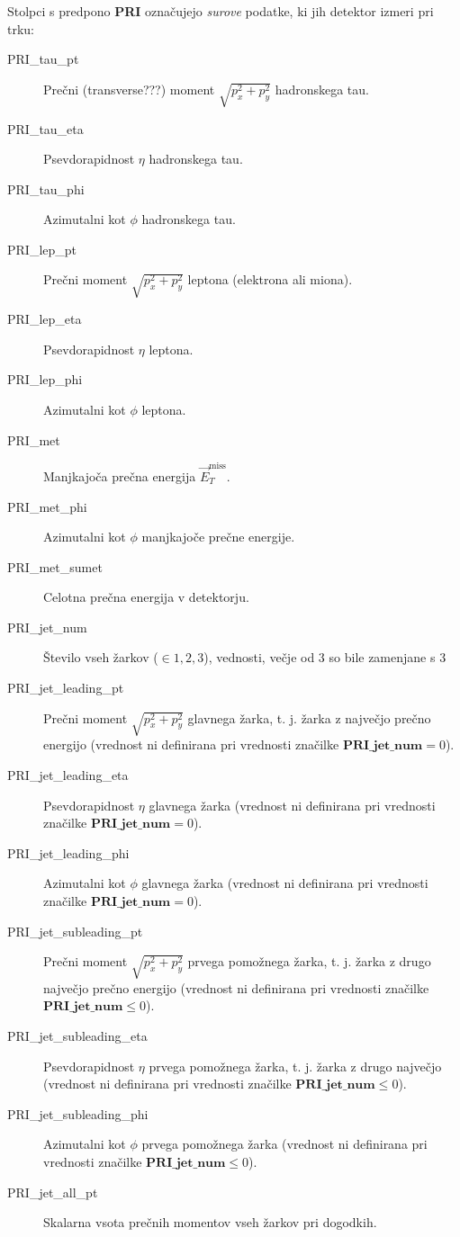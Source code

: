 \documentclass[11pt,a4paper,openany]{book}
\begin{document}
Stolpci s predpono \textbf{PRI} označujejo \textit{surove} podatke, ki jih detektor izmeri pri trku:
\begin{changemargin}{0.5cm}{0.0cm} 
\begin{description}
	\item[PRI\_tau\_pt] Prečni (transverse???) moment $\sqrt{p_x^2 + p_y^2}$ hadronskega tau.
	\item[PRI\_tau\_eta] Psevdorapidnost $\eta$ hadronskega tau.
	\item[PRI\_tau\_phi] Azimutalni kot $\phi$ hadronskega tau.
	
	\item[PRI\_lep\_pt] Prečni moment $\sqrt{p_x^2 + p_y^2}$ leptona (elektrona ali miona).
	\item[PRI\_lep\_eta] Psevdorapidnost $\eta$ leptona.
	\item[PRI\_lep\_phi] Azimutalni kot $\phi$ leptona.
	
	\item[PRI\_met] Manjkajoča prečna energija $\vec{E}_T^{\text{miss}}$.
	\item[PRI\_met\_phi] Azimutalni kot $\phi$ manjkajoče prečne energije.
	
	\item[PRI\_met\_sumet] Celotna prečna energija v detektorju.
	
	\item[PRI\_jet\_num] Število vseh žarkov ($\in {1, 2, 3}$), vednosti, večje od $3$ so bile zamenjane s 3
	
	\item[PRI\_jet\_leading\_pt] Prečni moment $\sqrt{p_x^2 + p_y^2}$ glavnega žarka, t. j. žarka z največjo prečno energijo (vrednost ni definirana pri vrednosti značilke $\textbf{PRI\_jet\_num} = 0$).
	\item[PRI\_jet\_leading\_eta] Psevdorapidnost $\eta$ glavnega žarka (vrednost ni definirana pri vrednosti značilke $\textbf{PRI\_jet\_num} = 0$).
	\item[PRI\_jet\_leading\_phi] Azimutalni kot $\phi$ glavnega žarka (vrednost ni definirana pri vrednosti značilke $\textbf{PRI\_jet\_num} = 0$).
	
	\item[PRI\_jet\_subleading\_pt] Prečni moment $\sqrt{p_x^2 + p_y^2}$ prvega pomožnega žarka, t. j. žarka z drugo največjo prečno energijo (vrednost ni definirana pri vrednosti značilke $\textbf{PRI\_jet\_num} \le 0$).
	\item[PRI\_jet\_subleading\_eta] Psevdorapidnost $\eta$ prvega pomožnega žarka, t. j. žarka z drugo največjo (vrednost ni definirana pri vrednosti značilke $\textbf{PRI\_jet\_num} \le 0$).
	\item[PRI\_jet\_subleading\_phi] Azimutalni kot $\phi$ prvega pomožnega žarka (vrednost ni definirana pri vrednosti značilke $\textbf{PRI\_jet\_num} \le 0$).
	
	\item[PRI\_jet\_all\_pt] Skalarna vsota prečnih momentov vseh žarkov pri dogodkih.
\end{description}
\end{changemargin}
\end{document}
